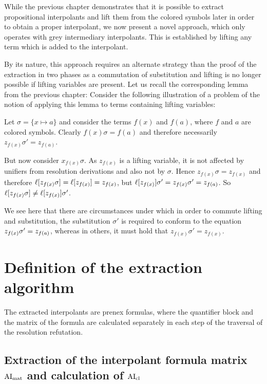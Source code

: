 \documentclass[,%
	draft=false,%
	numbers=noendperiod
	11pt,
	a4paper,
	oneside,%
	openany,
]{memoir}
\begin{document}
While the previous chapter demonstrates that it is possible to extract propositional interpolants and lift them from the colored symbols later in order to obtain a proper interpolant, we now present a novel approach, which only operates with grey intermediary interpolants.
This is established by lifting any term which is added to the interpolant.

By its nature, this approach requires an alternate strategy than the proof of the extraction in two phases as a commutation of substitution and lifting is no longer possible if lifting variables are present.
Let us recall the corresponding lemma from the previous chapter:
\lemmaCommutLiftSubst*
Consider the following illustration of a problem of the notion of applying this lemma to terms containing lifting variables:

\begin{exa}
	Let $\sigma = \{x \mapsto a\}$
	and consider the terms $f(x)$ and $f(a)$, where $f$ and $a$ are colored symbols.
	Clearly $f(x)\sigma = f(a)$ and therefore necessarily $z_{f(x)}\sigma' = z_{f(a)}$.

	But now consider $x_{f(x)} \sigma$.
	As $z_{f(x)}$ is a lifting variable, it is not affected by unifiers from resolution derivations and also not by $\sigma$.
	Hence $z_{f(x)}\sigma = z_{f(x)}$ and therefore $\ell[z_{f(x)}\sigma] = \ell[z_{f(x)}] = z_{f(x)}$, but $\ell[z_{f(x)}]\sigma' = z_{f(x)}\sigma' = z_{f(a)}$.
	So $\ell[z_{f(x)}\sigma] \neq \ell[z_{f(x)}]\sigma'$.

	We see here that there are circumstances under which in order to commute lifting and substitution,
	the substitution $\sigma'$ is required to conform to the equation
	$z_{f(x)}\sigma' =\nolinebreak z_{f(a)}$,
	whereas in others, it must hold that
	$z_{f(x)}\sigma' = z_{f(x)}$.
\end{exa}


\section{Definition of the extraction algorithm}

The extracted interpolants are prenex formulas, where
the quantifier block and the matrix of the formula are calculated separately in each step of the traversal of the resolution refutation.


\subsection{Extraction of the interpolant formula matrix $\operatorname{AI}_\mathrm{mat}$ and calculation of $\operatorname{AI}_\mathrm{cl}$}
\end{document}
